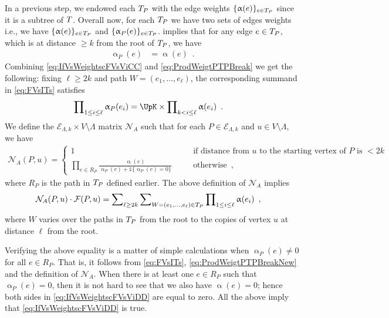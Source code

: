 \documentclass[11pt,reqno]{amsart}
\numberwithin{equation}{section}
\newcommand{\cE}{{\mathcal{E}}}
\newcommand{\cF}{{\mathcal{F}}}
\newcommand{\cN}{{\mathcal{N}}}
\newcommand{\applegreen}[1]{ {\color{applegreen}#1}}
\newcommand{\blue}[1]{{\color{blue}#1}}
\newcommand{\bluepigment}[1]{{\color{blue(pigment)}#1}}
\newcommand{\capri}[1]{{\color{capri}#1}}
\newcommand{\goldenbrown}[1]{{\color{goldenbrown}#1}}
\newcommand{\iris}[1]{{\color{iris}#1}}
\newcommand{\red}[1]{{\color{red}#1}}
\newcommand{\Ind}{\mathds{1}}
\newcommand{\ExtV}{\iris{\cE}}
\renewcommand{\applegreen}[1]{#1}
\renewcommand{\blue}[1]{#1}
\renewcommand{\bluepigment}[1]{#1}
\renewcommand{\capri}[1]{#1}
\renewcommand{\goldenbrown}[1]{#1}
\renewcommand{\iris}[1]{#1}
\renewcommand{\red}[1]{#1}
\newcommand{\ke}{\blue{e}}
\newcommand{\ki}{\capri{i}}
\newcommand{\kk}{\bluepigment{k}}
\newcommand{\kell}{{\color{green(pigment)}\ell}}%
\newcommand{\kP}{\goldenbrown{P}}
\newcommand{\ku}{\red{u}}
\newcommand{\kW}{\blue{W}}
\renewcommand{\ke}{e}
\renewcommand{\ki}{i}
\renewcommand{\kk}{k}
\renewcommand{\kell}{\ell}
\renewcommand{\kP}{P}
\renewcommand{\ku}{u}
\renewcommand{\kW}{W}
\newcommand{\SemExtdInfMatrix}{\cF}
\newcommand{\SymWeightMA}{\cN_A}
\newcommand{\infweight}{\upalpha}
\begin{document}
In a previous step, we endowed each $\EMTPw$ with the edge weights $\{\infweight(\ke)\}_{\ke\in \EMTPw}$ since it is a subtree of
$T$. Overall now, for each $\EMTPw$ we have two sets of edges weights i.e., we have $\{\infweight(\ke)\}_{\ke\in \EMTPw}$ and
$\{\infweight_{\kP}(\ke)\}_{\ke\in \EMTPw}$.
%
 implies that for any edge $\ke\in \EMTPw$, which is at distance $\geq k$ from
the root of $\EMTPw$, we have
\begin{align}\label{eq:IfVsWeightscFVsViCC}
\infweight_{\kP}(\ke)&=\infweight(\ke) \enspace. 
\end{align}
Combining \eqref{eq:IfVsWeightscFVsViCC} and \eqref{eq:ProdWeigtPTPBreak} we get the following:
fixing $\kell\geq 2\kk$ and path $\kW=(\ke_1,\ldots, \ke_{\kell})$, the corresponding summand in \eqref{eq:FVsITs} satisfies
\begin{align}\label{eq:ProdWeigtPTPBreakNew}
\prod\nolimits_{1\leq \ki\leq \kell} \infweight_{\kP}(\ke_{\ki}) &= \UpK \times \prod\nolimits_{\kk< \ki\leq \kell } \infweight(\ke_{\ki}) \enspace.
\end{align}
We define the $\ExtV_{\Lambda,\kk}\times V\setminus \Lambda$ matrix $\SymWeightMA$ 
such that for each $\kP\in \ExtV_{\Lambda,\kk}$ and $\ku\in V\setminus \Lambda$, we have
\begin{align}%
\SymWeightMA(\kP,\ku) = \left \{
\begin{array}{lcl} 
1 &\quad &\textrm{if distance from $\ku$ to the starting vertex of $\kP$ is $<2\kk$}\\
\prod_{\ke\in R_{\kP}}\frac{\infweight(\ke)}{\infweight_{\kP}(\ke)+\Ind\{\infweight_{\kP}(\ke)=0\}} &&\textrm{otherwise}\enspace,
\end{array}
\right . \nonumber
\end{align}
where $R_{\kP}$ is the  path in $\EMTPw$ defined earlier. 
%
The above definition of $\SymWeightMA$ implies 
\begin{align}\label{eq:IfVsWeightscFVsViDD}
 \SymWeightMA(\kP,\ku)\cdot \SemExtdInfMatrix(\kP, \ku)&= \sum\nolimits_{\kell\geq 2\kk} \sum\nolimits_{\kW=(\ke_1,\ldots, \ke_{\kell})\in \EMTPw} 
\prod\nolimits_{1\leq \ki\leq \kell }\infweight(\ke_{\ki}) \enspace,
\end{align}
where $\kW$ varies over the paths in $\EMTPw$ from the root to the copies of vertex $\ku$ at distance $\kell$
from the root.

Verifying the above equality is a matter of simple calculations when $\infweight_{\kP}(\ke)\neq 0$ 
for all $\ke\in R_{\kP}$.  That is, it follows from \eqref{eq:FVsITs}, \eqref{eq:ProdWeigtPTPBreakNew} 
and the definition of $\SymWeightMA$. 
%
When there is at least one $\ke\in R_{\kP}$ such that $\infweight_{\kP}(\ke)=0$, then it is not hard to 
see that we also have $\infweight(\ke)=0$; hence both sides in \eqref{eq:IfVsWeightscFVsViDD} are 
equal to zero.  All the above imply that \eqref{eq:IfVsWeightscFVsViDD} is true. 
\end{document}
